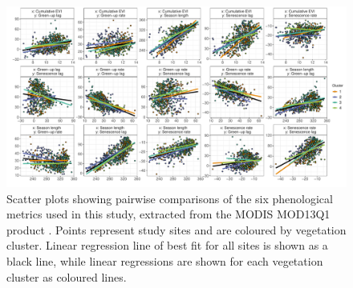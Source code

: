 \begin{refsection}
\begin{supplement}


\begin{landscape}
\begin{figure}[H]
	\includegraphics[width=0.9\linewidth]{img/phen_bivar}
	\caption[Bivariate comparison of phenological metrics]{Scatter plots showing pairwise comparisons of the six phenological metrics used in this study, extracted from the MODIS MOD13Q1 product \citep{MOD13Q1}. Points represent study sites and are coloured by vegetation cluster. Linear regression line of best fit for all sites is shown as a black line, while linear regressions are shown for each vegetation cluster as coloured lines.}
	\label{phen:phen_bivar}
\end{figure}
\end{landscape}

\renewcommand{\arraystretch}{0.8}



\renewcommand{\arraystretch}{1}

\FloatBarrier{}
\setlength\tabcolsep{2pt} 

\setlength\tabcolsep{6pt} 

\end{supplement} 

\end{refsection}

